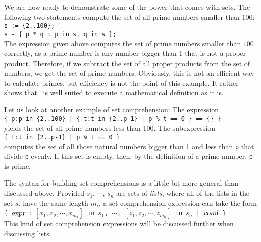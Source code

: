 We are now ready to demonstrate some of the power that comes with sets.  
The following two statements compute the set of all prime numbers smaller than $100$:
\\[0.2cm]
\hspace*{1.3cm}
\texttt{s := \{2..100\};}
\\
\hspace*{1.3cm}
\texttt{s - \{ p * q : p in s, q in s \};}
\\[0.2cm]
The expression given above computes the set of prime numbers smaller
than $100$ correctly, as a prime number
is any number bigger than 1 that is not a proper product.  Therefore, if we subtract the
set of all proper products from the set of numbers, we get the set of prime numbers.
Obviously, this is not an efficient way to calculate primes, but efficiency is not the
point of this example.  It rather shows that \setlx\ is well suited to execute a
mathematical definition as it is.

Let us look at another example of set comprehension:  The expression
\\[0.2cm]
\hspace*{1.3cm}
\texttt{\{ p:p in \{2..100\} | \{ t:t in \{2..p-1\} | p \% t == 0 \} == \{\} \}}
\\[0.2cm]
yields the set of all prime numbers less than 100.  The subexpression
\\[0.2cm]
\hspace*{1.3cm}
\texttt{\{ t:t in \{2..p-1\} | p \% t == 0 \}}
\\[0.2cm]
computes the set of all those natural numbers bigger than 1 and less than \texttt{p} that divide
\texttt{p} evenly.  If this set is empty, then, by the definition of a prime number, \texttt{p} is prime.

The syntax for building set comprehensions is a little bit more
general than discussed above.  Provided $s_1$, $\cdots$, $s_n$ are sets of \emph{lists},
where all of the lists in the set $s_i$ have the same length $m_i$, a set comprehension expression
can take the form
\\[0.2cm]
\hspace*{1.3cm}
\texttt{\{ $\textsl{expr}$ :$\;[x_1,x_2,\cdots,x_{m_1}]$ in $s_1$, $\cdots$, $[z_1,z_2,\cdots, z_{m_n}]$ in $s_n$ | $\textsl{cond}$ \}}.
\\[0.2cm]
This kind of set comprehension expressions will be discussed further when discussing lists.

